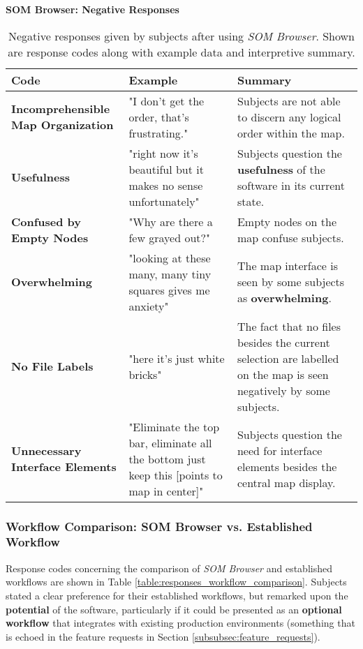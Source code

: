 \begin{table}[!htb]
  \renewcommand{\arraystretch}{1.2}
  \centering
  \textbf{SOM Browser: Negative Responses} \\ [3mm]
  \footnotesize
  \colorbox{light-bg}{
  \begin{tabular}{ p{4.0cm} p{4.75cm} p{4.75cm} }
  \hline
    \textbf{Code} & \textbf{Example} & \textbf{Summary} \\
    \hline
    \textbf{Incomprehensible Map Organization}
    &
    "I don't get the order, that’s frustrating."
    &
    Subjects are not able to discern any logical order within the map.
    \\
    \textbf{Usefulness}
    &
    "right now it's beautiful but it makes no sense unfortunately"
    &
    Subjects question the \textbf{usefulness} of the software in its current
    state.
    \\
    \textbf{Confused by Empty Nodes}
    &
    "Why are there a few grayed out?"
    &
    Empty nodes on the map confuse subjects.
    \\
    \textbf{Overwhelming}
    &
    "looking at these many, many tiny squares gives me anxiety"
    &
    The map interface is seen by some subjects as \textbf{overwhelming}.
    \\
    \textbf{No File Labels}
    &
    "here it’s just white bricks"
    &
    The fact that no files besides the current selection are labelled on the map
    is seen negatively by some subjects.
    \\
    \textbf{Unnecessary Interface Elements}
    &
    "Eliminate the top bar, eliminate all the bottom just keep this [points to
    map in center]"
    &
    Subjects question the need for interface elements besides the central map
    display.
    \\
  \end{tabular}}
  \caption[\textit{SOM Browser}: Negative Responses]{Negative responses given
  by subjects after using \textit{SOM Browser}. Shown are response codes along
  with example data and interpretive summary.}
  \label{table:responses_som-browser_negative}
\end{table}



\subsubsection{Workflow Comparison: SOM Browser vs. Established Workflow}
\label{subsubsec:workflow_comparison}
Response codes concerning the comparison of \textit{SOM Browser} and established
workflows are shown in Table \ref{table:responses_workflow_comparison}. Subjects
stated a clear preference for their established workflows, but remarked upon the
\textbf{potential} of the software, particularly if it could be presented as an
\textbf{optional workflow} that integrates with existing production environments
(something that is echoed in the feature requests in Section
\ref{subsubsec:feature_requests}).

